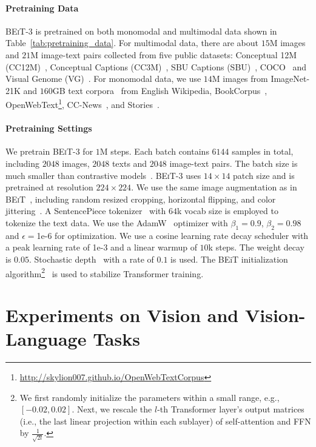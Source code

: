 \documentclass{article}
\newcommand\our{\textsc{BEiT-3}}
\newcommand\beit{\textsc{BEiT}}
\begin{document}
\paragraph{Pretraining Data}
\our{} is pretrained on both monomodal and multimodal data shown in Table~\ref{tab:pretraining_data}.
For multimodal data, there are about $15$M images and $21$M image-text pairs collected from five public datasets: Conceptual 12M (CC12M)~\citep{cc12m}, Conceptual Captions (CC3M)~\citep{gcc}, SBU Captions (SBU)~\citep{sbu}, COCO~\citep{coco} and Visual Genome (VG)~\citep{vg}.
For monomodal data, we use $14$M images from ImageNet-21K and $160$GB text corpora~\citep{unilm2} from English Wikipedia, BookCorpus~\citep{bookcorpus}, OpenWebText\footnote{\url{http://skylion007.github.io/OpenWebTextCorpus}}, CC-News~\citep{roberta}, and Stories~\citep{stories_data}.

\paragraph{Pretraining Settings}
We pretrain \our{} for $1$M steps.
Each batch contains $6144$ samples in total, including $2048$ images, $2048$ texts and $2048$ image-text pairs.
The batch size is much smaller than contrastive models~\citep{clip,align,coca}.
\our{} uses $14 \times 14$ patch size and is pretrained at resolution $224 \times 224$.
We use the same image augmentation as in \beit{}~\citep{beit}, including random resized cropping, horizontal flipping, and color jittering~\citep{coloraug}.
A SentencePiece tokenizer~\citep{sentencepiece} with $64$k vocab size is employed to tokenize the text data.
We use the AdamW~\citep{adamw} optimizer with $\beta_1=0.9$, $\beta_2=0.98$ and $\epsilon=$1e-6 for optimization.
We use a cosine learning rate decay scheduler with a peak learning rate of 1e-3 and a linear warmup of $10$k steps.
The weight decay is $0.05$.
Stochastic depth~\citep{drop_path} with a rate of $0.1$ is used.
The BEiT initialization algorithm\footnote{We first randomly initialize the parameters within a small range, e.g., $[-0.02, 0.02]$. Next, we rescale the $l$-th Transformer layer's output matrices (i.e., the last linear projection within each sublayer) of self-attention and FFN by $\frac{1}{\sqrt{2l}}$.}~\citep{beit} is used to stabilize Transformer training.


\section{Experiments on Vision and Vision-Language Tasks}
\label{sec:exps}
\end{document}
